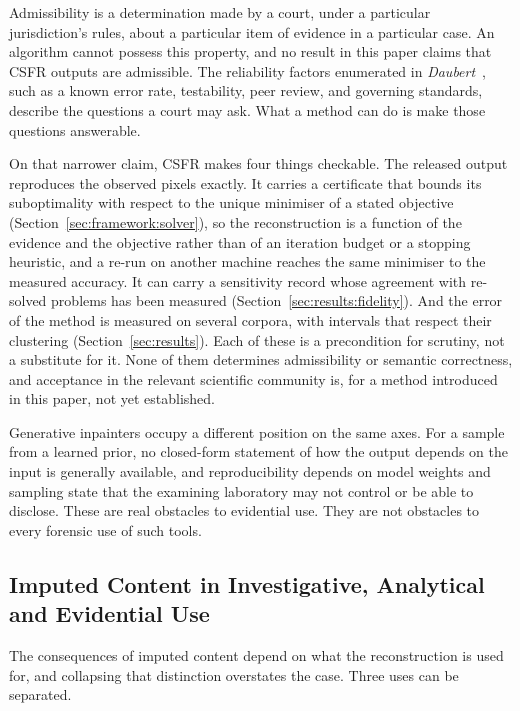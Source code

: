 \documentclass[final,3p]{elsarticle}
\begin{document}
Admissibility is a determination made by a court, under a particular jurisdiction's rules, about a particular item of evidence in a particular case. An algorithm cannot possess this property, and no result in this paper claims that CSFR outputs are admissible. The reliability factors enumerated in \emph{Daubert}~\cite{daubert1993}, such as a known error rate, testability, peer review, and governing standards, describe the questions a court may ask. What a method can do is make those questions answerable.

On that narrower claim, CSFR makes four things checkable. The released output reproduces the observed pixels exactly. It carries a certificate that bounds its suboptimality with respect to the unique minimiser of a stated objective (Section~\ref{sec:framework:solver}), so the reconstruction is a function of the evidence and the objective rather than of an iteration budget or a stopping heuristic, and a re-run on another machine reaches the same minimiser to the measured accuracy. It can carry a sensitivity record whose agreement with re-solved problems has been measured (Section~\ref{sec:results:fidelity}). And the error of the method is measured on several corpora, with intervals that respect their clustering (Section~\ref{sec:results}). Each of these is a precondition for scrutiny, not a substitute for it. None of them determines admissibility or semantic correctness, and acceptance in the relevant scientific community is, for a method introduced in this paper, not yet established.

Generative inpainters occupy a different position on the same axes. For a sample from a learned prior, no closed-form statement of how the output depends on the input is generally available, and reproducibility depends on model weights and sampling state that the examining laboratory may not control or be able to disclose. These are real obstacles to evidential use. They are not obstacles to every forensic use of such tools.

\subsection{Imputed Content in Investigative, Analytical and Evidential Use}

The consequences of imputed content depend on what the reconstruction is used for, and collapsing that distinction overstates the case. Three uses can be separated.
\end{document}
